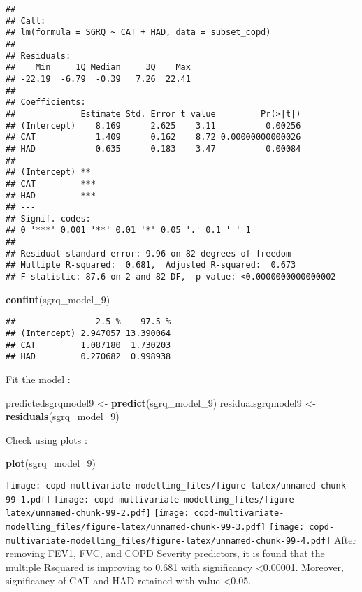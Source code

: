 \documentclass[
]{article}
\newenvironment{Shaded}{\begin{snugshade}}{\end{snugshade}}
\newcommand{\FunctionTok}[1]{\textcolor[rgb]{0.13,0.29,0.53}{\textbf{#1}}}
\newcommand{\NormalTok}[1]{#1}
\newcommand{\OtherTok}[1]{\textcolor[rgb]{0.56,0.35,0.01}{#1}}
\begin{document}
\begin{verbatim}
## 
## Call:
## lm(formula = SGRQ ~ CAT + HAD, data = subset_copd)
## 
## Residuals:
##    Min     1Q Median     3Q    Max 
## -22.19  -6.79  -0.39   7.26  22.41 
## 
## Coefficients:
##             Estimate Std. Error t value         Pr(>|t|)
## (Intercept)    8.169      2.625    3.11          0.00256
## CAT            1.409      0.162    8.72 0.00000000000026
## HAD            0.635      0.183    3.47          0.00084
##                
## (Intercept) ** 
## CAT         ***
## HAD         ***
## ---
## Signif. codes:  
## 0 '***' 0.001 '**' 0.01 '*' 0.05 '.' 0.1 ' ' 1
## 
## Residual standard error: 9.96 on 82 degrees of freedom
## Multiple R-squared:  0.681,  Adjusted R-squared:  0.673 
## F-statistic: 87.6 on 2 and 82 DF,  p-value: <0.0000000000000002
\end{verbatim}

\begin{Shaded}
\begin{Highlighting}[]
\FunctionTok{confint}\NormalTok{(sgrq\_model\_9)}
\end{Highlighting}
\end{Shaded}

\begin{verbatim}
##                2.5 %    97.5 %
## (Intercept) 2.947057 13.390064
## CAT         1.087180  1.730203
## HAD         0.270682  0.998938
\end{verbatim}

Fit the model :

\begin{Shaded}
\begin{Highlighting}[]
\NormalTok{predictedsgrqmodel9 }\OtherTok{\textless{}{-}} \FunctionTok{predict}\NormalTok{(sgrq\_model\_9)}
\NormalTok{residualsgrqmodel9 }\OtherTok{\textless{}{-}} \FunctionTok{residuals}\NormalTok{(sgrq\_model\_9)}
\end{Highlighting}
\end{Shaded}

Check using plots :

\begin{Shaded}
\begin{Highlighting}[]
\FunctionTok{plot}\NormalTok{(sgrq\_model\_9)}
\end{Highlighting}
\end{Shaded}

\texttt{[image: copd-multivariate-modelling\_files/figure-latex/unnamed-chunk-99-1.pdf]}
\texttt{[image: copd-multivariate-modelling\_files/figure-latex/unnamed-chunk-99-2.pdf]}
\texttt{[image: copd-multivariate-modelling\_files/figure-latex/unnamed-chunk-99-3.pdf]}
\texttt{[image: copd-multivariate-modelling\_files/figure-latex/unnamed-chunk-99-4.pdf]}
After removing FEV1, FVC, and COPD Severity predictors, it is found that
the multiple Rsquared is improving to 0.681 with significancy
\textless0.00001. Moreover, significancy of CAT and HAD retained with
value \textless0.05.
\end{document}
